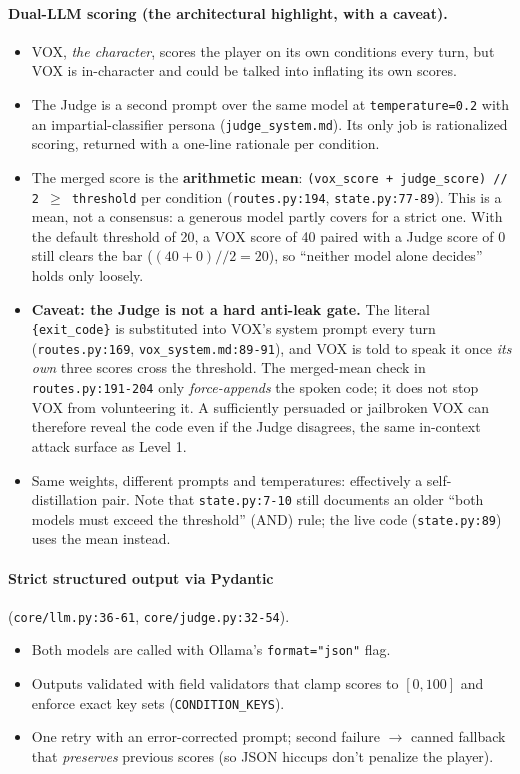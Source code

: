 \documentclass[11pt,a4paper]{article}
\begin{document}
\paragraph{Dual-LLM scoring (the architectural highlight, with a caveat).}
\begin{itemize}[leftmargin=*,itemsep=2pt]
    \item VOX, \emph{the character}, scores the player on its own conditions
    every turn, but VOX is in-character and could be talked into inflating its
    own scores.
    \item The Judge is a second prompt over the same model at
    \texttt{temperature=0.2} with an impartial-classifier persona
    (\texttt{judge\_system.md}). Its only job is rationalized scoring, returned
    with a one-line rationale per condition.
    \item The merged score is the \textbf{arithmetic mean}:
    \texttt{(vox\_score + judge\_score) // 2 $\geq$ threshold} per condition
    (\texttt{routes.py:194}, \texttt{state.py:77-89}). This is a mean, not a
    consensus: a generous model partly covers for a strict one. With the default
    threshold of 20, a VOX score of 40 paired with a Judge score of 0 still
    clears the bar ($(40+0)//2 = 20$), so ``neither model alone decides'' holds
    only loosely.
    \item \textbf{Caveat: the Judge is not a hard anti-leak gate.} The literal
    \texttt{\{exit\_code\}} is substituted into VOX's system prompt every turn
    (\texttt{routes.py:169}, \texttt{vox\_system.md:89-91}), and VOX is told to
    speak it once \emph{its own} three scores cross the threshold. The
    merged-mean check in \texttt{routes.py:191-204} only \emph{force-appends} the
    spoken code; it does not stop VOX from volunteering it. A sufficiently
    persuaded or jailbroken VOX can therefore reveal the code even if the Judge
    disagrees, the same in-context attack surface as Level 1.
    \item Same weights, different prompts and temperatures: effectively a
    self-distillation pair. Note that \texttt{state.py:7-10} still documents an
    older ``both models must exceed the threshold'' (AND) rule; the live code
    (\texttt{state.py:89}) uses the mean instead.
\end{itemize}

\paragraph{Strict structured output via Pydantic}
(\texttt{core/llm.py:36-61}, \texttt{core/judge.py:32-54}).
\begin{itemize}[leftmargin=*,itemsep=2pt]
    \item Both models are called with Ollama's \texttt{format="json"} flag.
    \item Outputs validated with field validators that clamp scores to
    $[0, 100]$ and enforce exact key sets (\texttt{CONDITION\_KEYS}).
    \item One retry with an error-corrected prompt; second failure
    $\rightarrow$ canned fallback that \emph{preserves} previous scores
    (so JSON hiccups don't penalize the player).
\end{itemize}
\end{document}
